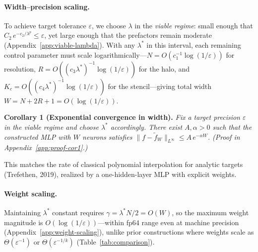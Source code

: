 \documentclass{article}
\begin{document}
\paragraph{Width--precision scaling.}
To achieve target tolerance \(\varepsilon\), we choose \(\lambda\) in the \emph{viable regime}: small enough that \(C_2\,e^{-c_2/\lambda^p}\le\varepsilon\), yet large enough that the prefactors remain moderate (Appendix~\ref{app:viable-lambda}).  With any \(\lambda^*\) in this interval, each remaining control parameter must scale logarithmically---\(N = O(c_1^{-1}\log(1/\varepsilon))\) for resolution, \(R = O((c_3\lambda^*)^{-1}\log(1/\varepsilon))\) for the halo, and \(K_c = O((c_4\lambda^*)^{-1}\log(1/\varepsilon))\) for the stencil---giving total width \(W = N + 2R + 1 = O(\log(1/\varepsilon))\).

\medskip
\noindent\textbf{Corollary 1 (Exponential convergence in width).}
\emph{Fix a target precision \(\varepsilon\) in the viable regime and choose \(\lambda^*\) accordingly.  There exist \(A,\alpha>0\) such that the constructed MLP with \(W\) neurons satisfies \(\|f - \widetilde{f}_W\|_{L^\infty} \le A\,e^{-\alpha W}\).  (Proof in Appendix~\ref{app:proof-cor1}.)}

\smallskip
This matches the rate of classical polynomial interpolation for analytic targets (Trefethen, 2019), realized by a one-hidden-layer MLP with explicit weights.

\paragraph{Weight scaling.}
Maintaining \(\lambda^*\) constant requires \(\gamma = \lambda^*N/2 = O(W)\), so the maximum weight magnitude is \(O(\log(1/\varepsilon))\)---within fp64 range even at machine precision (Appendix~\ref{app:weight-scaling}), unlike prior constructions where weights scale as \(\Theta(\varepsilon^{-1})\) or \(\Theta(\varepsilon^{-1/k})\) (Table~\ref{tab:comparison}).
\end{document}
